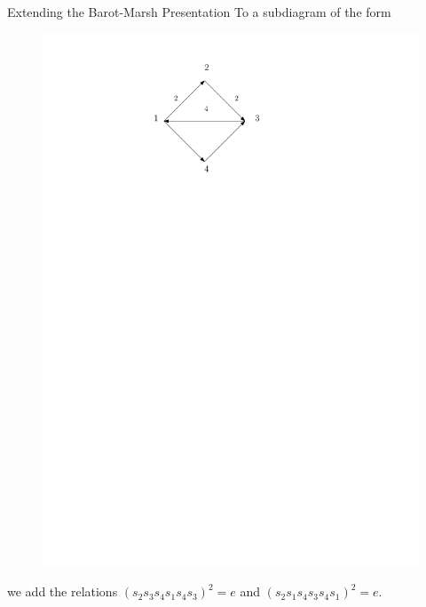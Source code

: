 \documentclass{beamer}
\begin{document}
\begin{frame}{Extending the Barot-Marsh Presentation}
To a subdiagram of the form
\begin{figure}
\includegraphics[scale = .50]{Diagram3.pdf}
\end{figure}
we add the relations $(s_{2}s_{3}s_{4}s_{1}s_{4}s_{3})^{2} = e$ and $(s_{2}s_{1}s_{4}s_{3}s_{4}s_{1})^{2} = e$.
\end{frame}
\end{document}
